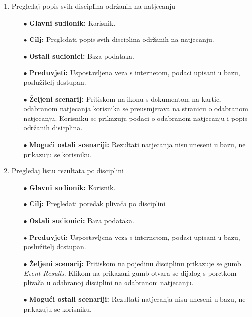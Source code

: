 \documentclass[times, utf8, zavrsni]{fer}
\begin{document}
\begin{enumerate}
    \item Pregledaj popis svih disciplina održanih na natjecanju
    \begin{itemize}
        \item[$\bullet$] \textbf{Glavni sudionik:} Korisnik.
        \item[$\bullet$] \textbf{Cilj:} Pregledati popis svih disciplina održanih na natjecanju.
        \item[$\bullet$] \textbf{Ostali sudionici:} Baza podataka.
        \item[$\bullet$] \textbf{Preduvjeti:} Uspostavljena veza s internetom, podaci upisani u bazu, poslužitelj dostupan.
        \item[$\bullet$] \textbf{Željeni scenarij:} Pritiskom na ikonu s dokumentom na kartici odabranom natjecanja korisnika se preusmjerava na stranicu o odabranom
        natjecanju. Korisniku se prikazuju podaci o odabranom natjecanju i popis održanih disicplina.
        \item[$\bullet$] \textbf{Mogući ostali scenariji:} Rezultati natjecanja nisu uneseni u bazu, ne prikazuju se korisniku.
    \end{itemize}


    \item Pregledaj listu rezultata po disciplini
    \begin{itemize}
        \item[$\bullet$] \textbf{Glavni sudionik:} Korisnik.
        \item[$\bullet$] \textbf{Cilj:} Pregledati poredak plivača po disciplini
        \item[$\bullet$] \textbf{Ostali sudionici:} Baza podataka.
        \item[$\bullet$] \textbf{Preduvjeti:} Uspostavljena veza s internetom, podaci upisani u bazu, poslužitelj dostupan.
        \item[$\bullet$] \textbf{Željeni scenarij:} Pritiskom na pojedinu disciplinu prikazuje se gumb \textit{Event Results}. Klikom na prikazani gumb otvara
        se dijalog s poretkom plivača u odabranoj disciplini na odabranom natjecanju.
        \item[$\bullet$] \textbf{Mogući ostali scenariji:} Rezultati natjecanja nisu uneseni u bazu, ne prikazuju se korisniku.
    \end{itemize}



\end{enumerate}
\end{document}
